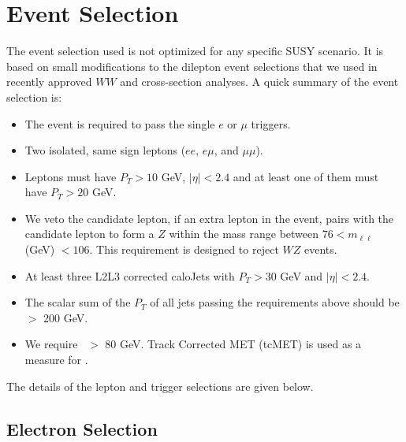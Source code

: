 \section{Event Selection}
\label{sec:eventselection}

The event selection used is not optimized for any specific SUSY scenario.
It is based on small modifications to the dilepton event selections 
that we used in recently approved 
$WW$\cite{ww} and \ttbar\cite{ttbar} cross-section
analyses.  A quick summary of the event selection is:
\begin{itemize}
\item The event is required to pass the single $e$ or $\mu$  triggers.
\item Two isolated, same sign leptons ($ee$, $e\mu$, and $\mu\mu$). 
\item Leptons must have $P_T > 10$ GeV, $|\eta|< 2.4$ and at least one of them must have $P_T > 20$ GeV.
\item We veto the candidate lepton, if an extra lepton in the event, pairs with the candidate lepton
to form a $Z$ within the mass range between $76 < m_{\ell\ell} $ (GeV) $< 106$. This requirement is 
designed to reject $WZ$ events.
\item At least three L2L3 corrected caloJets with $P_T > 30$ GeV and $|\eta|< 2.4$.
\item The scalar sum of the $P_T$ of all jets passing the requirements above should be $>$ 200 GeV.
\item We require \met~$>$ 80 GeV. Track Corrected MET (tcMET) \cite{tcmet} is used as a measure for \met.
\end{itemize}
\noindent The details of the lepton and trigger selections are given below.

\subsection{Electron Selection}
\label{sec:electron}

